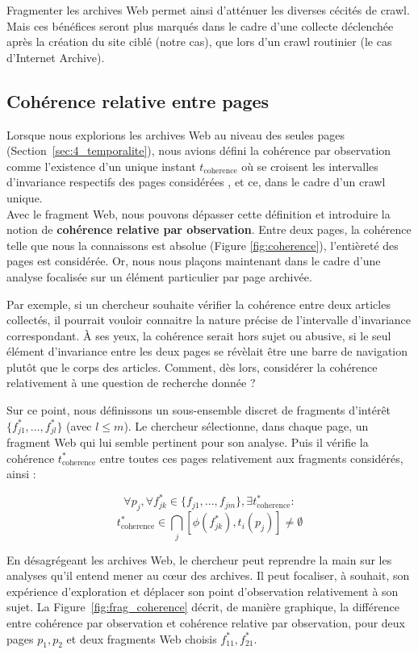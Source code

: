 \documentclass[symmetric,justified,marginals=raggedouter]{tufte-book}
\begin{document}
Fragmenter les archives Web permet ainsi d'atténuer les diverses cécités de crawl. Mais ces bénéfices seront plus marqués dans le cadre d'une collecte déclenchée après la création du site ciblé (notre cas), que lors d'un crawl routinier (le cas d'Internet Archive).    

\subsection{Cohérence relative entre pages}

\noindent Lorsque nous explorions les archives Web au niveau des seules pages (Section~\ref{sec:4_temporalite}), nous avions défini la cohérence par observation comme l'existence d'un unique instant $t_{\mathrm{coherence}}$ où se croisent les intervalles d'invariance respectifs des pages considérées \citep{spaniol_data_2009}, et ce, dans le cadre d'un crawl unique. \\

\noindent Avec le fragment Web, nous pouvons dépasser cette définition et introduire la notion de \textbf{cohérence relative par observation}. Entre deux pages, la cohérence telle que nous la connaissons est absolue (Figure \ref{fig:coherence}), l'entièreté des pages est considérée. Or, nous nous plaçons maintenant dans le cadre d'une analyse focalisée sur un élément particulier par page archivée. 

Par exemple, si un chercheur souhaite vérifier la cohérence entre deux articles collectés, il pourrait vouloir connaitre la nature précise de l'in\-tervalle d'invariance correspondant. À ses yeux, la cohérence serait hors sujet ou abusive, si le seul élément d'invariance entre les deux pages se révèlait être une barre de navigation plutôt que le corps des articles. Comment, dès lors, considérer la cohérence relativement à une question de recherche donnée ? 

Sur ce point, nous définissons un sous-ensemble discret de fragments d'intérêt $\{f^*_{j1},...,f^*_{jl}\}$ (avec $l \leq m$). Le chercheur sélectionne, dans chaque page, un fragment Web qui lui semble pertinent pour son analyse. Puis il vérifie la cohérence $t^*_{\mathrm{coherence}}$ entre toutes ces pages relativement aux fragments considérés, ainsi :

\[
	\forall p_j, \forall f^*_{jk} \in \{f_{j1},...,f_{jm}\}, \exists t^*_{\mathrm{coherence}}:
\] 
\[
	t^*_{\mathrm{coherence}} \in \bigcap_{j}[\phi(f^*_{jk}),t_i(p_j)] \neq \emptyset
\] 

\noindent En désagrégeant les archives Web, le chercheur peut reprendre la main sur les analyses qu'il entend mener au cœur des archives. Il peut focaliser, à souhait, son expérience d'explo\-ration et déplacer son point d'observation relativement à son sujet. La Figure~\ref{fig:frag_coherence} décrit, de manière graphique, la différence entre cohérence par observation et cohérence relative par observation, pour deux pages $p_1, p_2$ et deux fragments Web choisis $f^*_{11}, f^*_{21}$. 
\end{document}
